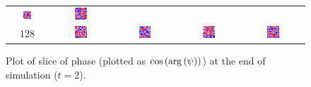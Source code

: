 \documentclass{article}
\begin{document}
\begin{figure}[ht]
\begin{tabular}{cccc|c}
\includegraphics[width=0.22\textwidth]{s42r64s20psi3_phase.png} &
\includegraphics[width=0.22\textwidth]{s42r64s20psi1_phase_scalar.png} \\
$128$ & 
\includegraphics[width=0.22\textwidth]{s42r128s20psi1_phase.png} &
\includegraphics[width=0.22\textwidth]{s42r128s20psi2_phase.png} &
\includegraphics[width=0.22\textwidth]{s42r128s20psi3_phase.png} &
\includegraphics[width=0.22\textwidth]{s42r128s20psi1_phase_scalar.png} \\
\end{tabular}
\caption{Plot of slice of phase (plotted as $\cos\left({\rm arg}\left(\psi\right)\right)$) at the end of simulation ($t=2$).}
\end{figure}
\end{document}
